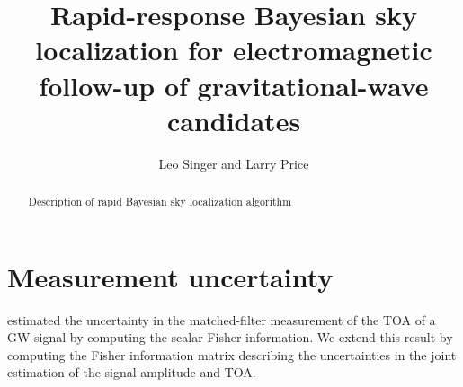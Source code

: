 \documentclass{iopart}
\begin{document}
\title[Rapid-response Bayesian sky localization]{Rapid-response Bayesian sky localization for electromagnetic follow-up of gravitational-wave candidates}
\author{Leo Singer and Larry Price}
\address{LIGO Laboratory, California Institute of Technology, Pasadena, CA 91125, USA}

\begin{abstract}
Description of rapid Bayesian sky localization algorithm
\end{abstract}

\section{Measurement uncertainty}
\cite{fairhurst:2009} estimated the uncertainty in the matched-filter measurement of the \ac{TOA} of a \ac{GW} signal by computing the scalar Fisher information.  We extend this result by computing the Fisher information matrix describing the uncertainties in the joint estimation of the signal amplitude and \ac{TOA}.
\end{document}
